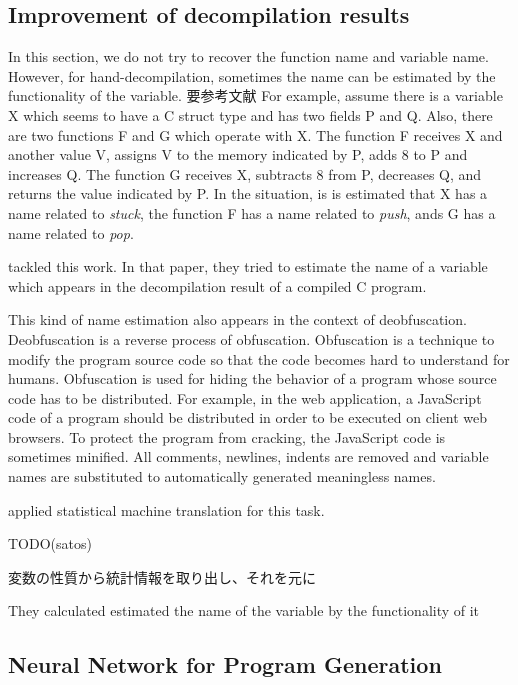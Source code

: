 \documentclass[senior,final,11pt]{iscs-thesis}
\begin{document}
\subsection{Improvement of decompilation results}
In this section, we do not try to recover the function name and variable name. 
However, for hand-decompilation, sometimes the name can be estimated by the functionality of the variable.
要参考文献
For example, assume there is a variable X which seems to have a C struct type and has two fields P and Q.
Also, there are two functions F and G which operate with X. 
The function F receives X and another value V, assigns V to the memory indicated by P, adds 8 to P and increases Q. 
The function G receives X, subtracts 8 from P, decreases Q, and returns the value indicated by P.
In the situation, is is estimated that X has a name related to {\sl stuck}, the function F has a name related to {\sl push},
ands G has a name related to {\sl pop}.

\cite{name_recover_from_decompile_result} tackled this work. 
In that paper, they tried to estimate the name of a variable which appears in the decompilation result of a compiled C program.

This kind of name estimation also appears in the context of deobfuscation.
\cite{deobfsucation_matome}
Deobfuscation is a reverse process of obfuscation.
Obfuscation is a technique to modify the program source code so that the code becomes hard to understand for humans. 
Obfuscation is used for hiding the behavior of a program whose source code has to be distributed.
For example, in the web application, a JavaScript code of a program should be distributed in order to be executed on client web browsers.
To protect the program from cracking, the JavaScript code is sometimes minified. All comments, newlines, indents are removed and variable names are substituted to automatically generated meaningless names. 

\cite{JSNaughty} applied statistical machine translation for this task. 

TODO(satos)

変数の性質から統計情報を取り出し、それを元に

They calculated estimated the name of the variable by the functionality of it

\subsection{Neural Network for Program Generation}
\end{document}
